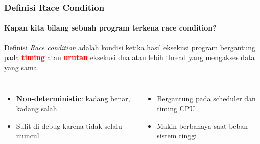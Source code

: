 \documentclass[t,aspectratio=169,xcolor=dvipsnames]{beamer}
\newcommand{\tem}[1]{\textbf{\textcolor{red}{#1}}}
\begin{document}
\begin{frame}
    \frametitle{Definisi Race Condition}
    \framesubtitle{Kapan kita bilang sebuah program terkena race condition?}
    \small

    \begin{block}{Definisi}
        \textit{Race condition} adalah kondisi ketika hasil eksekusi program bergantung pada \tem{timing} atau \tem{urutan} eksekusi dua atau lebih thread yang mengakses data yang sama.
    \end{block}

    \vspace{0.2cm}
    \begin{columns}[T]
        \begin{itemize}
            \item \textbf{Non-deterministic}: kadang benar, kadang salah
            \item Sulit di-debug karena tidak selalu muncul
        \end{itemize}

        \begin{itemize}
            \item Bergantung pada scheduler dan timing CPU
            \item Makin berbahaya saat beban sistem tinggi
        \end{itemize}
    \end{columns}
\end{frame}
\end{document}
